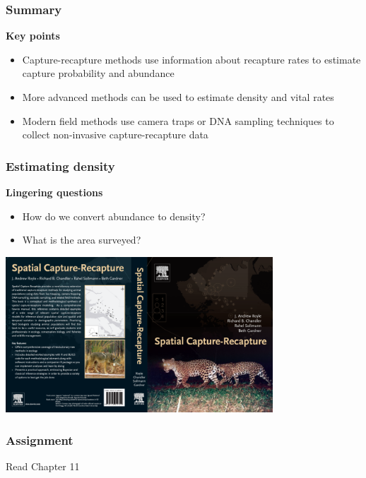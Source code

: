 \documentclass[color=usenames,dvipsnames]{beamer}\usepackage[]{graphicx}\usepackage[]{color}
\begin{document}
\begin{frame}
  \frametitle{Summary}
  \large
  {\bf Key points}
  \begin{itemize}
    \item Capture-recapture methods use information about recapture
      rates to estimate capture probability and abundance
    \item More advanced methods can be used to estimate density and vital rates
    \item Modern field methods use camera traps or DNA sampling techniques to collect non-invasive capture-recapture data
  \end{itemize}
\end{frame}







\begin{frame}
  \frametitle{Estimating density}
  \large
  {\bf Lingering questions}
  \begin{itemize}
    \item How do we convert abundance to density?
    \item What is the area surveyed?
  \end{itemize}
  \pause
  \begin{center}
    \includegraphics[width=0.75\textwidth]{figs/scrbook}
  \end{center}
\end{frame}




\begin{frame}
  \frametitle{Assignment}
  \centering
  \huge
  Read Chapter 11 \\
\end{frame}
\end{document}
